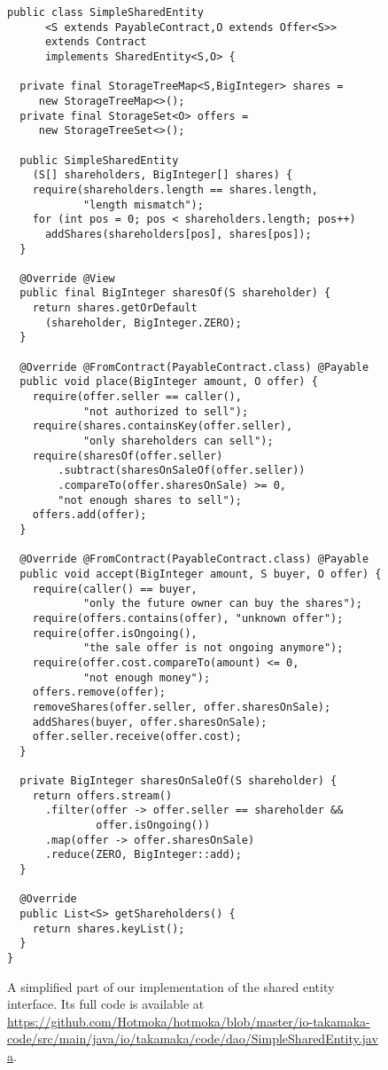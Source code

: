 \begin{figure}[t]
  \begin{center}
    \begin{lstlisting}[language=Takamaka]
public class SimpleSharedEntity
      <S extends PayableContract,O extends Offer<S>>
      extends Contract
      implements SharedEntity<S,O> {

  private final StorageTreeMap<S,BigInteger> shares = 
     new StorageTreeMap<>();
  private final StorageSet<O> offers = 
     new StorageTreeSet<>();        

  public SimpleSharedEntity
    (S[] shareholders, BigInteger[] shares) {
    require(shareholders.length == shares.length, 
            "length mismatch");
    for (int pos = 0; pos < shareholders.length; pos++)
      addShares(shareholders[pos], shares[pos]);
  }

  @Override @View
  public final BigInteger sharesOf(S shareholder) {
    return shares.getOrDefault
      (shareholder, BigInteger.ZERO);
  }

  @Override @FromContract(PayableContract.class) @Payable
  public void place(BigInteger amount, O offer) {
    require(offer.seller == caller(), 
            "not authorized to sell");
    require(shares.containsKey(offer.seller), 
            "only shareholders can sell");
    require(sharesOf(offer.seller)
        .subtract(sharesOnSaleOf(offer.seller))
        .compareTo(offer.sharesOnSale) >= 0, 
        "not enough shares to sell");
    offers.add(offer);
  }

  @Override @FromContract(PayableContract.class) @Payable
  public void accept(BigInteger amount, S buyer, O offer) {
    require(caller() == buyer, 
            "only the future owner can buy the shares");
    require(offers.contains(offer), "unknown offer");
    require(offer.isOngoing(), 
            "the sale offer is not ongoing anymore");
    require(offer.cost.compareTo(amount) <= 0, 
            "not enough money");
    offers.remove(offer);
    removeShares(offer.seller, offer.sharesOnSale);
    addShares(buyer, offer.sharesOnSale);
    offer.seller.receive(offer.cost);
  }

  private BigInteger sharesOnSaleOf(S shareholder) {
    return offers.stream()
      .filter(offer -> offer.seller == shareholder && 
              offer.isOngoing())
      .map(offer -> offer.sharesOnSale)
      .reduce(ZERO, BigInteger::add);
  }

  @Override
  public List<S> getShareholders() {
    return shares.keyList();
  }
}
    \end{lstlisting}
  \end{center}
  \caption{A simplified part of our implementation of the shared entity interface.
  Its full code is available at \textsf{\url{https://github.com/Hotmoka/hotmoka/blob/master/io-takamaka-code/src/main/java/io/takamaka/code/dao/SimpleSharedEntity.java}}.}\label{fig:simple_shared_entity}
\end{figure}

